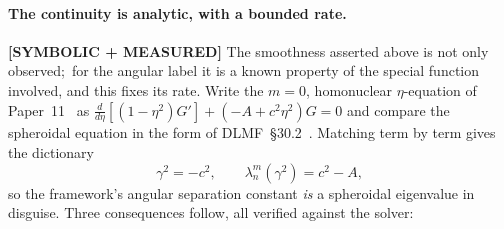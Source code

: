 \documentclass[aps,pra,twocolumn,superscriptaddress,longbibliography]{revtex4-2}
\begin{document}
\paragraph{The continuity is analytic, with a bounded rate.}
\textbf{[SYMBOLIC + MEASURED]} The smoothness asserted above is not only
observed;\ for the angular label it is a known property of the special
function involved, and this fixes its rate.  Write the $m = 0$,
homonuclear $\eta$-equation of Paper~11~\cite{loutey_paper11} as
$\frac{d}{d\eta}\!\left[(1 - \eta^2)G'\right] + (-A + c^2\eta^2)G = 0$ and
compare the spheroidal equation in the form of DLMF~\S30.2~\cite{dlmf}.
Matching term by term gives the dictionary
\begin{equation}
  \gamma^2 = -c^2, \qquad \lambda^{m}_{n}(\gamma^2) = c^2 - A,
  \label{eq:dlmf_dictionary}
\end{equation}
so the framework's angular separation constant \emph{is} a spheroidal
eigenvalue in disguise.  Three consequences follow, all verified against
the solver:
\end{document}
